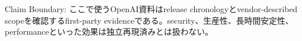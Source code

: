 \begin{claimboundary}
Claim Boundary: ここで使うOpenAI資料はrelease chronologyとvendor-described scopeを確認するfirst-party evidenceである。security、生産性、長時間安定性、performanceといった効果は独立再現済みとは扱わない。\autocite{src-1ecdad90bfb4,src-20e34cbfb714,src-c71ef79e3212,src-f9ff221789e0}
\end{claimboundary}
